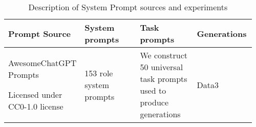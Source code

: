 \begin{table*}[ht]
\caption{Description of System Prompt sources and experiments}
\label{table:datasets}
\vskip 0.15in
\begin{center}
\begin{tabular}{p{0.24\linewidth}p{0.24\linewidth}p{0.24\linewidth}p{0.24\linewidth}}
\toprule
Prompt Source & System prompts & Task prompts & Generations \\
\midrule
AwesomeChatGPT Prompts 

Licensed under CC0-1.0 license & 153 role system prompts & We construct 50 universal task prompts used to produce generations  & Data3 \\
\bottomrule
\end{tabular}
\end{center}
\vskip -0.1in
\end{table*}